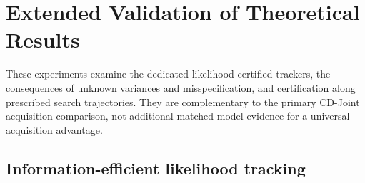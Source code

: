\documentclass{article}
\theoremstyle{plain}
\theoremstyle{definition}
\begin{document}
\clearpage

\section{Extended Validation of Theoretical Results}
\label{app:group-extended}\label{app:validity-expanded}\label{app:unknown-expanded}

These experiments examine the dedicated likelihood-certified trackers, the consequences of unknown variances and misspecification, and certification along prescribed search trajectories. They are complementary to the primary CD-Joint acquisition comparison, not additional matched-model evidence for a universal acquisition advantage.

\subsection{Information-efficient likelihood tracking}
\end{document}
